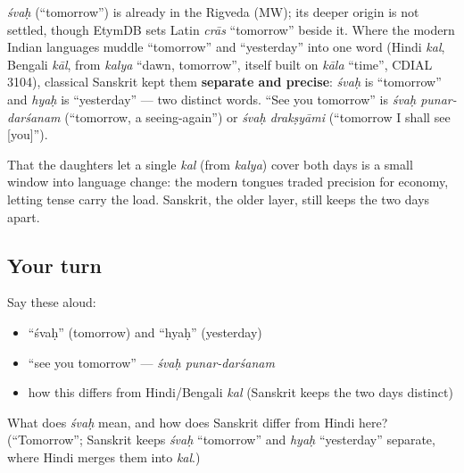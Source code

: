 \begin{cousinweb}
\emph{śvaḥ} (\textquotedblleft{}tomorrow\textquotedblright{}) is already in the Rigveda (MW); its deeper origin is not settled, though EtymDB sets Latin \emph{crās} \textquotedblleft{}tomorrow\textquotedblright{} beside it. Where the modern Indian languages muddle \textquotedblleft{}tomorrow\textquotedblright{} and \textquotedblleft{}yesterday\textquotedblright{} into one word (Hindi \emph{kal}, Bengali \emph{kāl}, from \emph{kalya} \textquotedblleft{}dawn, tomorrow\textquotedblright{}, itself built on \emph{kāla} \textquotedblleft{}time\textquotedblright{}, CDIAL 3104), classical Sanskrit kept them \textbf{separate and precise}: \emph{śvaḥ} is \textquotedblleft{}tomorrow\textquotedblright{} and \emph{hyaḥ} is \textquotedblleft{}yesterday\textquotedblright{} — two distinct words. \textquotedblleft{}See you tomorrow\textquotedblright{} is \emph{śvaḥ punar-darśanam} (\textquotedblleft{}tomorrow, a seeing-again\textquotedblright{}) or \emph{śvaḥ drakṣyāmi} (\textquotedblleft{}tomorrow I shall see {[}you{]}\textquotedblright{}).
\end{cousinweb}

\begin{grammarlens}[title={Grammar Lens: Sanskrit's precision}]
That the daughters let a single \emph{kal} (from \emph{kalya}) cover both days is a small window into language change: the modern tongues traded precision for economy, letting tense carry the load. Sanskrit, the older layer, still keeps the two days apart.
\end{grammarlens}

\subsection*{Your turn}
Say these aloud:

\begin{itemize}
\raggedright
  \item \textquotedblleft{}śvaḥ\textquotedblright{} (tomorrow) and \textquotedblleft{}hyaḥ\textquotedblright{} (yesterday)
  \item \textquotedblleft{}see you tomorrow\textquotedblright{} — \emph{śvaḥ punar-darśanam}
  \item how this differs from Hindi/Bengali \emph{kal} (Sanskrit keeps the two days distinct)
\end{itemize}

\begin{tcolorbox}[breakable,colback=teal!4,colframe=teal!35!black,title={Before you move on}]
What does \emph{śvaḥ} mean, and how does Sanskrit differ from Hindi here? (\textquotedblleft{}Tomorrow\textquotedblright{}; Sanskrit keeps \emph{śvaḥ} \textquotedblleft{}tomorrow\textquotedblright{} and \emph{hyaḥ} \textquotedblleft{}yesterday\textquotedblright{} separate, where Hindi merges them into \emph{kal}.)
\end{tcolorbox}
